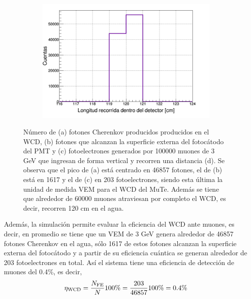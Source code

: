 \documentclass[12pt,oneside,openany,letter]{book}
\begin{document}
\begin{figure}
\begin{subfigure}{0.45\textwidth}
        \caption{}
        \label{fotoelectrones_vem}
    \end{subfigure}
    \begin{subfigure}{0.45\textwidth}
        \includegraphics[width=\textwidth]{distancia_vem.png}
        \caption{}
        \label{distancia_vem}
    \end{subfigure}
    \caption[Número de fotones Cherenkov producidos en el WCD, fotones que alcanzan la superficie del fotoc\'atodo del PMT y fotoelectrones generados por muones verticales de 3 GeV]{Número de (a) fotones Cherenkov producidos producidos en el WCD, (b) fotones que alcanzan la superficie externa del fotoc\'atodo del PMT y (c) fotoelectrones generados por 100000 muones de 3 GeV que ingresan de forma vertical y recorren una distancia (d). Se observa que el pico de (a) está centrado en 46857 fotones, el de (b) está en 1617 y el de (c) en 203 fotoelectrones, siendo esta \'ultima la unidad de medida VEM para el WCD del MuTe. Además se tiene que alrededor de 60000 muones atraviesan por completo el WCD, es decir, recorren 120 cm en el agua.}\label{VEM_plots}
\end{figure}

Además, la simulación permite evaluar la eficiencia del WCD ante muones, es decir, en promedio se tiene que un VEM de 3 GeV genera alrededor de 46857 fotones Cherenkov en el agua, sólo 1617 de estos fotones alcanzan la superficie externa del fotoc\'atodo y a partir de su eficiencia cuántica se generan alrededor de 203 fotoelectrones en total. Así el sistema tiene una eficiencia de detección de muones del 0.4\%, es decir, 
\begin{equation}
\eta_{\mathrm{WCD}}=\frac{N_{\mathrm{FE}}}{N} 100\%=\frac{203}{46857}100\%=0\textnormal{.}4\%
\end{equation}
\end{document}
